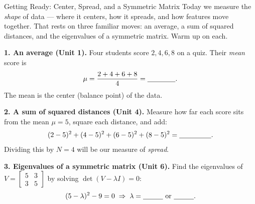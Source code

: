 \documentclass[10pt]{article}
\begin{document}
\namedateperiod

\vspace{0.12in}

\begin{notesbox}{Getting Ready: Center, Spread, and a Symmetric Matrix}
\small Today we measure the \emph{shape} of data --- where it centers, how it spreads, and how features move
together. That rests on three familiar moves: an average, a sum of squared distances, and the eigenvalues of a
symmetric matrix. Warm up on each.

\vspace{4pt}
\textbf{1. An average (Unit 1).} Four students score $2,4,6,8$ on a quiz. Their \emph{mean} score is
\[
  \mu=\frac{2+4+6+8}{4}=\blank{1.4cm}.
\]
The mean is the center (balance point) of the data.

\vspace{4pt}
\textbf{2. A sum of squared distances (Unit 4).} Measure how far each score sits from the mean $\mu=5$, square
each distance, and add:
\[
  (2-5)^2+(4-5)^2+(6-5)^2+(8-5)^2=\blank{1.6cm}.
\]
Dividing this by $N=4$ will be our measure of \emph{spread}.

\vspace{4pt}
\textbf{3. Eigenvalues of a symmetric matrix (Unit 6).} Find the eigenvalues of
$V=\left[\begin{smallmatrix}5&3\\3&5\end{smallmatrix}\right]$ by solving $\det(V-\lambda I)=0$:
\[
  (5-\lambda)^2-9=0 \;\Rightarrow\; \lambda=\blank{1.0cm}\ \text{or}\ \blank{1.0cm}.
\]
\end{notesbox}
\end{document}
